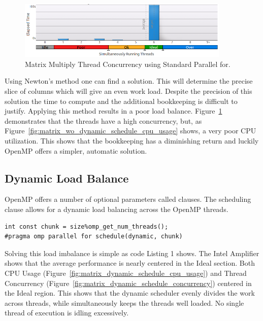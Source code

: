 \documentclass[10pt]{article}
\begin{document}
\begin{figure}[h]
\begin{center}
\includegraphics[width=0.9\textwidth]{figures/matrix_without_dynamic_schedule_thread_concurrency.png}
\caption{Matrix Multiply Thread Concurrency using Standard Parallel for.}
\label{fig:matrix_wo_dynamic_schedule_concurrency}
\end{center}
\end{figure}
Using Newton's method one can find a solution. This will determine the precise slice of
 columns which will give an even work load. 
Despite the precision of this solution the time to compute and the additional bookkeeping
is difficult to justify. Applying this method results in a poor load balance.  
Figure~\ref{fig:matrix_wo_dynamic_schedule_concurrency} demonstrates that the threads have a high 
concurrency, but, as Figure~\ref{fig:matrix_wo_dynamic_schedule_cpu_usage} shows, a very poor CPU 
utilization. This shows that the bookkeeping has a diminishing 
return and luckily OpenMP offers a simpler, automatic solution.

\subsection{Dynamic Load Balance}
OpenMP offers a number of optional parameters called clauses. The scheduling clause allows
for a dynamic load balancing across the OpenMP threads.  

\label{lst:AutomaticLoadBalancing}
\begin{lstlisting}
int const chunk = size%omp_get_num_threads();
#pragma omp parallel for schedule(dynamic, chunk)
\end{lstlisting}
Solving this load imbalance is simple as code Listing 1 shows.
The Intel Amplifier shows that the average performance is nearly centered in the Ideal
section. Both CPU Usage (Figure~\ref{fig:matrix_dynamic_schedule_cpu_usage}) and 
Thread Concurrency (Figure~\ref{fig:matrix_dynamic_schedule_concurrency}) centered in the 
Ideal region. This shows that the dynamic scheduler evenly divides the work across threads, 
while simultaneously keeps the threads well loaded.  No single thread of execution is idling 
excessively.
\end{document}
